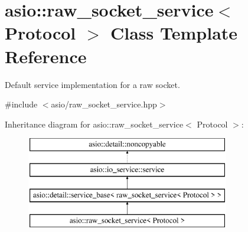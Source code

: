 \hypertarget{classasio_1_1raw__socket__service}{}\section{asio\+:\+:raw\+\_\+socket\+\_\+service$<$ Protocol $>$ Class Template Reference}
\label{classasio_1_1raw__socket__service}


Default service implementation for a raw socket.  




{\ttfamily \#include $<$asio/raw\+\_\+socket\+\_\+service.\+hpp$>$}

Inheritance diagram for asio\+:\+:raw\+\_\+socket\+\_\+service$<$ Protocol $>$\+:\begin{figure}[H]
\begin{center}
\leavevmode
\includegraphics[height=4.000000cm]{classasio_1_1raw__socket__service}
\end{center}
\end{figure}
